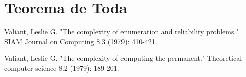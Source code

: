 \documentclass[paper=a4, fontsize=11pt]{scrartcl} %
\begin{document}
\pagebreak
\section{Teorema de Toda}


\pagebreak
\begin{thebibliography}{1}

 Valiant, Leslie G. "The complexity of enumeration and reliability problems." SIAM Journal on Computing 8.3 (1979): 410-421.

 Valiant, Leslie G. "The complexity of computing the permanent." Theoretical computer science 8.2 (1979): 189-201.

\end{thebibliography}
\end{document}
